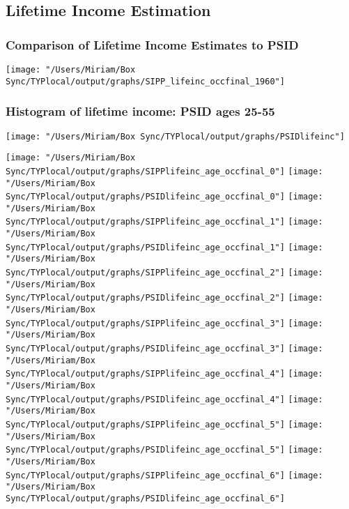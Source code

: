 \documentclass[11pt]{article}
\begin{document}
\subsection{Lifetime Income Estimation}
\subsubsection{Comparison of Lifetime Income Estimates to PSID}

\texttt{[image: "/Users/Miriam/Box Sync/TYPlocal/output/graphs/SIPP\_lifeinc\_occfinal\_1960"]}
\subsubsection{Histogram of lifetime income: PSID ages 25-55}
\texttt{[image: "/Users/Miriam/Box Sync/TYPlocal/output/graphs/PSIDlifeinc"]}

\begin{center}
\clearpage
\texttt{[image: "/Users/Miriam/Box Sync/TYPlocal/output/graphs/SIPPlifeinc\_age\_occfinal\_0"]}
\newline
\texttt{[image: "/Users/Miriam/Box Sync/TYPlocal/output/graphs/PSIDlifeinc\_age\_occfinal\_0"]}
\clearpage
\texttt{[image: "/Users/Miriam/Box Sync/TYPlocal/output/graphs/SIPPlifeinc\_age\_occfinal\_1"]}
\newline
\texttt{[image: "/Users/Miriam/Box Sync/TYPlocal/output/graphs/PSIDlifeinc\_age\_occfinal\_1"]}
\clearpage
\texttt{[image: "/Users/Miriam/Box Sync/TYPlocal/output/graphs/SIPPlifeinc\_age\_occfinal\_2"]}
\newline
\texttt{[image: "/Users/Miriam/Box Sync/TYPlocal/output/graphs/PSIDlifeinc\_age\_occfinal\_2"]}
\clearpage
\texttt{[image: "/Users/Miriam/Box Sync/TYPlocal/output/graphs/SIPPlifeinc\_age\_occfinal\_3"]}
\newline
\texttt{[image: "/Users/Miriam/Box Sync/TYPlocal/output/graphs/PSIDlifeinc\_age\_occfinal\_3"]}
\clearpage
\texttt{[image: "/Users/Miriam/Box Sync/TYPlocal/output/graphs/SIPPlifeinc\_age\_occfinal\_4"]}
\newline
\texttt{[image: "/Users/Miriam/Box Sync/TYPlocal/output/graphs/PSIDlifeinc\_age\_occfinal\_4"]}
\clearpage
\texttt{[image: "/Users/Miriam/Box Sync/TYPlocal/output/graphs/SIPPlifeinc\_age\_occfinal\_5"]}
\newline
\texttt{[image: "/Users/Miriam/Box Sync/TYPlocal/output/graphs/PSIDlifeinc\_age\_occfinal\_5"]}
\clearpage
\texttt{[image: "/Users/Miriam/Box Sync/TYPlocal/output/graphs/SIPPlifeinc\_age\_occfinal\_6"]}
\newline
\texttt{[image: "/Users/Miriam/Box Sync/TYPlocal/output/graphs/PSIDlifeinc\_age\_occfinal\_6"]}
\clearpage
\end{center}
\end{document}
